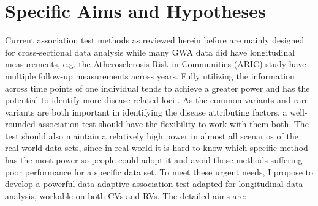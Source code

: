 \documentclass[12pt]{article}
\begin{document}
\section{Specific Aims and Hypotheses}\label{sec:aims}
Current association test methods as reviewed herein before are mainly designed for cross-sectional data analysis while many GWA data did have longitudinal measurements, e.g. the Atherosclerosis Risk in Communities (ARIC) study \cite{Chambless1997} have multiple follow-up measurements across years. Fully utilizing the information across time points of one individual tends to achieve a greater power and has the potential to identify more disease-related loci \cite{Furlotte2012,Xu2014}. As the common variants and rare variants are both important in identifying the disease attributing factors, a well-rounded association test should have the flexibility to work with them both. The test should also maintain a relatively high power in almost all scenarios of the real world data sets, since in real world it is hard to know which specific method has the most power so people could adopt it and avoid those methods suffering poor performance for a specific data set. To meet these urgent needs, I propose to develop a powerful data-adaptive association test adapted for longitudinal data analysis, workable on both CVs and RVs. The detailed aims are:
\end{document}
